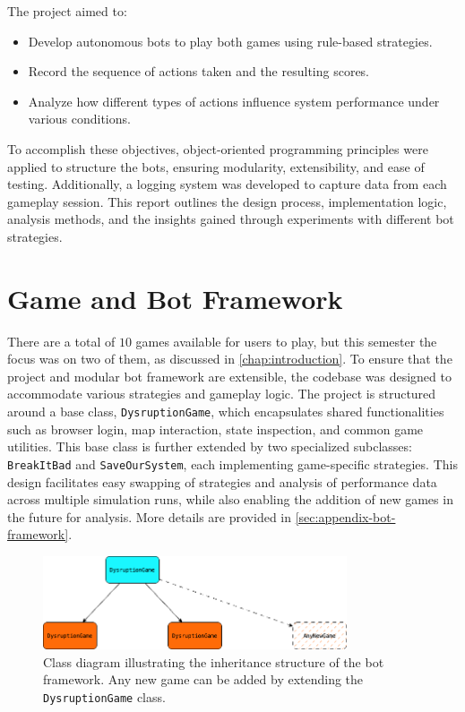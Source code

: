 \documentclass[12pt,a4paper]{report}
\begin{document}
    The project aimed to:
    \begin{itemize}
        \item Develop autonomous bots to play both games using rule-based strategies.
        \item Record the sequence of actions taken and the resulting scores.
        \item Analyze how different types of actions influence system performance under various conditions.
    \end{itemize}

    To accomplish these objectives, object-oriented programming principles were applied to structure the bots, ensuring modularity, extensibility, and ease of testing. Additionally, a logging system was developed to capture data from each gameplay session. This report outlines the design process, implementation logic, analysis methods, and the insights gained through experiments with different bot strategies.

\chapter{Game and Bot Framework}
\label{chap:game-bot-framework}
    There are a total of $10$ games available for users to play, but this semester the focus was on two of them, as discussed in \cref{chap:introduction}. To ensure that the project and modular bot framework are extensible, the codebase was designed to accommodate various strategies and gameplay logic. The project is structured around a base class, \texttt{DysruptionGame}, which encapsulates shared functionalities such as browser login, map interaction, state inspection, and common game utilities. This base class is further extended by two specialized subclasses: \texttt{BreakItBad} and \texttt{SaveOurSystem}, each implementing game-specific strategies. This design facilitates easy swapping of strategies and analysis of performance data across multiple simulation runs, while also enabling the addition of new games in the future for analysis. More details are provided in \cref{sec:appendix-bot-framework}.

    \begin{figure}[h!]
        \centering
        \includegraphics[width=0.8\textwidth]{images/class.png}
        \caption{Class diagram illustrating the inheritance structure of the bot framework. Any new game can be added by extending the \texttt{DysruptionGame} class.}
        \label{fig:class-diagram}
    \end{figure}
\end{document}
